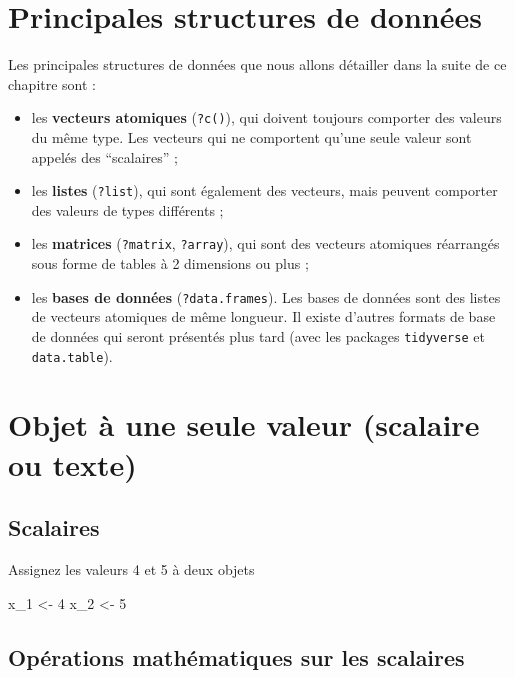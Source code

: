 \documentclass[
]{book}
\newenvironment{Shaded}{\begin{snugshade}}{\end{snugshade}}
\newcommand{\DecValTok}[1]{\textcolor[rgb]{0.00,0.00,0.81}{#1}}
\newcommand{\NormalTok}[1]{#1}
\newcommand{\OtherTok}[1]{\textcolor[rgb]{0.56,0.35,0.01}{#1}}
\providecommand{\tightlist}{%
  \setlength{\itemsep}{0pt}\setlength{\parskip}{0pt}}
\begin{document}
\section{Principales structures de données}\label{principales-structures-de-donnuxe9es}

Les principales structures de données que nous allons détailler dans la suite de ce chapitre sont :

\begin{itemize}
\tightlist
\item
  les \textbf{vecteurs atomiques} (\texttt{?c()}), qui doivent toujours comporter des valeurs du même type. Les vecteurs qui ne comportent qu'une seule valeur sont appelés des ``scalaires'' ;
\item
  les \textbf{listes} (\texttt{?list}), qui sont également des vecteurs, mais peuvent comporter des valeurs de types différents ;
\item
  les \textbf{matrices} (\texttt{?matrix}, \texttt{?array}), qui sont des vecteurs atomiques réarrangés sous forme de tables à 2 dimensions ou plus ;
\item
  les \textbf{bases de données} (\texttt{?data.frames}). Les bases de données sont des listes de vecteurs atomiques de même longueur. Il existe d'autres formats de base de données qui seront présentés plus tard (avec les packages \texttt{tidyverse} et \texttt{data.table}).
\end{itemize}

\section{Objet à une seule valeur (scalaire ou texte)}\label{objet-uxe0-une-seule-valeur-scalaire-ou-texte}

\subsection{Scalaires}\label{scalaires}

Assignez les valeurs 4 et 5 à deux objets

\begin{Shaded}
\begin{Highlighting}[]
\NormalTok{x\_1 }\OtherTok{\textless{}{-}} \DecValTok{4}
\NormalTok{x\_2 }\OtherTok{\textless{}{-}} \DecValTok{5}
\end{Highlighting}
\end{Shaded}

\subsection{Opérations mathématiques sur les scalaires}\label{opuxe9rations-mathuxe9matiques-sur-les-scalaires}
\end{document}
